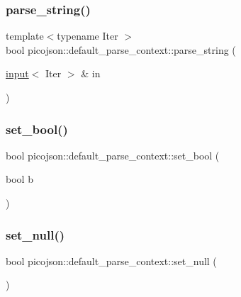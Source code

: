 \subsubsection{\texorpdfstring{parse\+\_\+string()}{parse\_string()}}
{\footnotesize\ttfamily template$<$typename Iter $>$ \\
bool picojson\+::default\+\_\+parse\+\_\+context\+::parse\+\_\+string (\begin{DoxyParamCaption}\item[{\hyperlink{classpicojson_1_1input}{input}$<$ Iter $>$ \&}]{in }\end{DoxyParamCaption})\hspace{0.3cm}{\ttfamily [inline]}}

\hypertarget{classpicojson_1_1default__parse__context_ae1935ef455fc2bed9195426cfee5713a}{}\label{classpicojson_1_1default__parse__context_ae1935ef455fc2bed9195426cfee5713a} 
\subsubsection{\texorpdfstring{set\+\_\+bool()}{set\_bool()}}
{\footnotesize\ttfamily bool picojson\+::default\+\_\+parse\+\_\+context\+::set\+\_\+bool (\begin{DoxyParamCaption}\item[{bool}]{b }\end{DoxyParamCaption})\hspace{0.3cm}{\ttfamily [inline]}}

\hypertarget{classpicojson_1_1default__parse__context_a2d852ba1f0b115c89378fcb5f10580b5}{}\label{classpicojson_1_1default__parse__context_a2d852ba1f0b115c89378fcb5f10580b5} 
\subsubsection{\texorpdfstring{set\+\_\+null()}{set\_null()}}
{\footnotesize\ttfamily bool picojson\+::default\+\_\+parse\+\_\+context\+::set\+\_\+null (\begin{DoxyParamCaption}{ }\end{DoxyParamCaption})\hspace{0.3cm}{\ttfamily [inline]}}

